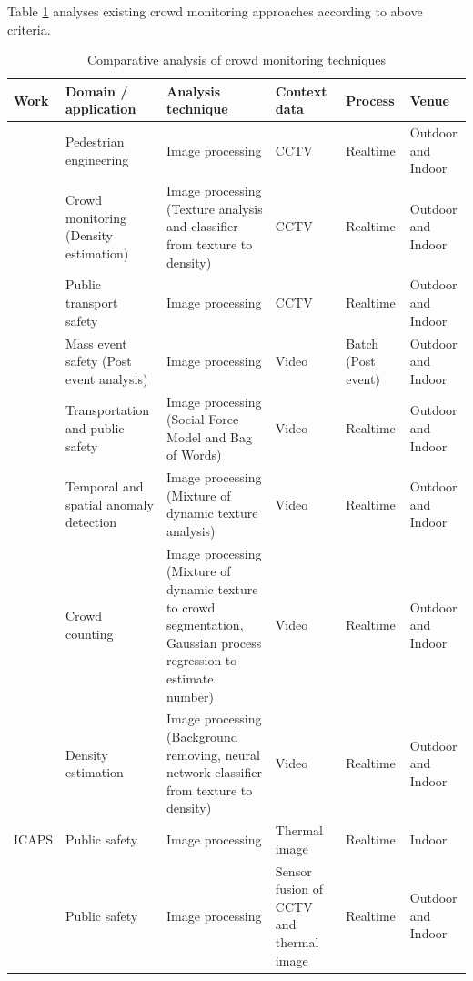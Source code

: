 Table \ref{table:crowdMonitoringTechAnalysis} analyses existing crowd monitoring approaches according to above criteria.

\begin{center}
	\begin{longtable}{|p{2cm}|p{2.5cm}|p{2.5cm}|p{2cm}|p{1.5cm}|p{2cm}|}
		\caption{Comparative analysis of crowd monitoring techniques}
		\label{table:crowdMonitoringTechAnalysis} \\
		\hline
		\textbf{Work} & \textbf{Domain / application} & \textbf{Analysis technique} & \textbf{Context data} & \textbf{Process} & \textbf{Venue} \\
		\hline \hline
		\citet{Davies1995} & Pedestrian engineering & Image processing & CCTV & Realtime & Outdoor and Indoor \\
		\hline
		\citet{Marana1997} & Crowd monitoring (Density estimation) & Image processing (Texture analysis and classifier from texture to density) & CCTV & Realtime & Outdoor and Indoor \\
		\hline
		\citet{Velastin1999} & Public transport safety & Image processing & CCTV & Realtime & Outdoor and Indoor \\
		\hline
		\citet{Johansson2008} & Mass event safety (Post event analysis) & Image processing & Video & Batch (Post event) & Outdoor and Indoor \\
		\hline
		\citet{Mehran2009} & Transportation and public safety & Image processing (Social Force Model and Bag of Words) & Video & Realtime & Outdoor and Indoor \\
		\hline
		\citet{Mahadevan2010} & Temporal and spatial anomaly detection & Image processing (Mixture of dynamic texture analysis) & Video & Realtime & Outdoor and Indoor \\
		\hline
		\citet{Chan2008} & Crowd counting & Image processing (Mixture of dynamic texture to crowd segmentation, Gaussian process regression to estimate number) & Video & Realtime & Outdoor and Indoor \\
		\hline
		\citet{Li2010} & Density estimation & Image processing (Background removing, neural network classifier from texture to density) & Video & Realtime & Outdoor and Indoor \\
		\hline
		ICAPS \citep{Pham2007} & Public safety & Image processing & Thermal image & Realtime & Indoor \\
		\hline
		\citet{Andersson2009} & Public safety & Image processing & Sensor fusion of CCTV and thermal image & Realtime & Outdoor and Indoor \\

\end{longtable}
\end{center}
